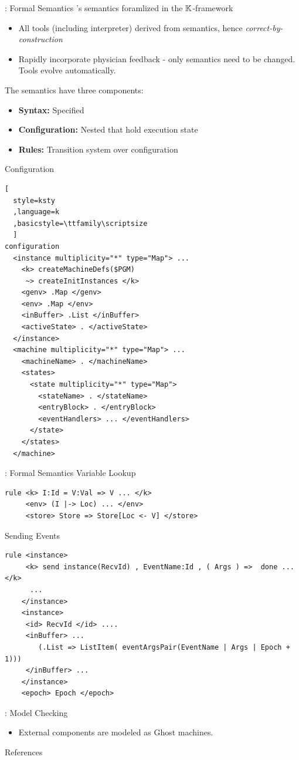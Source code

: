 \documentclass{beamer}
\begin{document}
\begin{frame}{\MediK{}: Formal Semantics}
  \MediK{}'s semantics foramlized in the $\mathbb{K}{}$-framework
  \begin{itemize}
    \item All tools (including interpreter) derived from semantics,
      hence \emph{correct-by-construction}
    \item Rapidly incorporate physician feedback - only
      semantics need to be changed. Tools evolve automatically.
  \end{itemize}
  \pause
  The semantics have three components:
  \begin{itemize}
    \item \textbf{Syntax:} Specified
    \item \textbf{Configuration:} Nested  that hold execution state
    \item \textbf{Rules:} Transition system over configuration
  \end{itemize}
\end{frame}
\begin{frame}[fragile]{\MediK{} Configuration}

\begin{lstlisting}[
  style=ksty
  ,language=k
  ,basicstyle=\ttfamily\scriptsize
  ]
configuration
  <instance multiplicity="*" type="Map"> ...
    <k> createMachineDefs($PGM)
     ~> createInitInstances </k>
    <genv> .Map </genv>
    <env> .Map </env>
    <inBuffer> .List </inBuffer>
    <activeState> . </activeState>
  </instance>
  <machine multiplicity="*" type="Map"> ...
    <machineName> . </machineName>
    <states>
      <state multiplicity="*" type="Map">
        <stateName> . </stateName>
        <entryBlock> . </entryBlock>
        <eventHandlers> ... </eventHandlers>
      </state>
    </states>
  </machine>
\end{lstlisting}
\end{frame}
\begin{frame}[fragile]{\MediK{}: Formal Semantics}
  Variable Lookup
  \begin{lstlisting}[language=k,style=ksty,basicstyle=\ttfamily\tiny]
rule <k> I:Id = V:Val => V ... </k>
     <env> (I |-> Loc) ... </env>
     <store> Store => Store[Loc <- V] </store>
  \end{lstlisting}
  \pause
  Sending Events
  \begin{lstlisting}[language=k,style=ksty,basicstyle=\ttfamily\tiny]
rule <instance>
     <k> send instance(RecvId) , EventName:Id , ( Args ) =>  done ... </k>
      ...
    </instance>
    <instance>
     <id> RecvId </id> ....
     <inBuffer> ...
        (.List => ListItem( eventArgsPair(EventName | Args | Epoch + 1)))
     </inBuffer> ...
    </instance>
    <epoch> Epoch </epoch>
  \end{lstlisting}
\end{frame}
\begin{frame}{\MediK{}: Model Checking}
  \begin{itemize}
    \item External components are modeled as \alert{Ghost} machines.
  \end{itemize}
\end{frame}
\begin{frame}[allowframebreaks]{References}
  
\end{frame}
\end{document}
